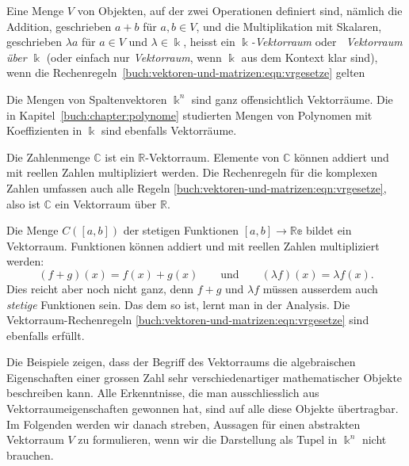 \begin{definition}
Eine Menge $V$ von Objekten, auf der zwei Operationen definiert sind,
nämlich die Addition, geschrieben $a+b$ für $a,b\in V$, und die
Multiplikation mit Skalaren, geschrieben $\lambda a$ für $a\in V$ und
$\lambda\in \Bbbk$, heisst ein {\em $\Bbbk$-Vektorraum} oder {\em Vektorraum
über $\Bbbk$} (oder
einfach nur {\em Vektorraum}, wenn $\Bbbk$ aus dem Kontext klar sind),
wenn die Rechenregeln~\eqref{buch:vektoren-und-matrizen:eqn:vrgesetze}
gelten
%
%
\end{definition}

Die Mengen von Spaltenvektoren $\Bbbk^n$ sind ganz offensichtlich
Vektorräume.
Die in Kapitel~\ref{buch:chapter:polynome} studierten Mengen von
Polynomen mit Koeffizienten in $\Bbbk$ sind ebenfalls Vektorräume.

\begin{beispiel}
Die Zahlenmenge $\mathbb{C}$ ist ein $\mathbb{R}$-Vektorraum.
%
Elemente von $\mathbb{C}$ können addiert und mit reellen Zahlen
multipliziert werden.
Die Rechenregeln für die komplexen Zahlen umfassen auch alle Regeln
\eqref{buch:vektoren-und-matrizen:eqn:vrgesetze}, also ist
$\mathbb{C}$ ein Vektorraum über $\mathbb{R}$.
\end{beispiel}

\begin{beispiel}
Die Menge $C([a,b])$ der stetigen Funktionen $[a,b]\to\mathbb{Re}$
bildet ein Vektorraum.
%
Funktionen können addiert und mit reellen Zahlen multipliziert werden:
\[
(f+g)(x) = f(x) + g(x)
\qquad\text{und}\qquad
(\lambda f)(x) = \lambda f(x).
\]
Dies reicht aber noch nicht ganz, denn $f+g$ und $\lambda f$ müssen
ausserdem auch {\em stetige} Funktionen sein.
Das dem so ist, lernt man in der Analysis.
Die Vektorraum-Rechenregeln
\eqref{buch:vektoren-und-matrizen:eqn:vrgesetze} sind ebenfalls erfüllt.
\end{beispiel}

Die Beispiele zeigen, dass der Begriff des Vektorraums die algebraischen
Eigenschaften einer grossen Zahl sehr verschiedenartiger mathematischer
Objekte beschreiben kann.
Alle Erkenntnisse, die man ausschliesslich aus Vektorraumeigenschaften
gewonnen hat, sind auf alle diese Objekte übertragbar.
Im Folgenden werden wir danach streben, Aussagen für einen 
abstrakten Vektorraum $V$ zu formulieren,
wenn wir die Darstellung als Tupel in $\Bbbk^n$ nicht brauchen.


